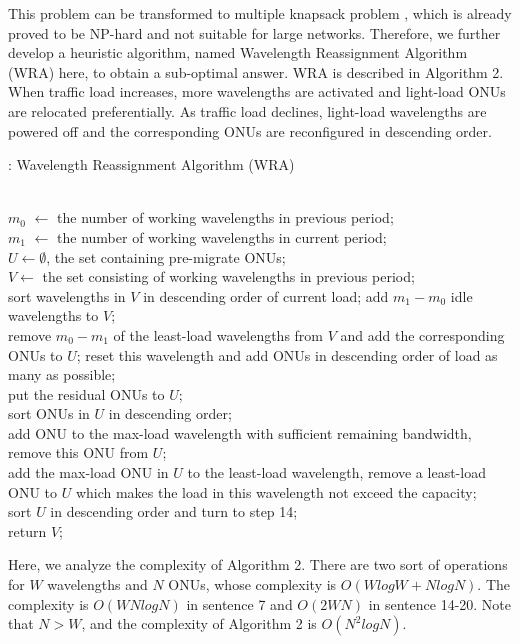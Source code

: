 \documentclass[letter]{IEEEtran}
\begin{document}
This problem can be transformed to multiple knapsack problem \cite{dawande2000approximation}, which is already proved to be NP-hard and not suitable for large networks. Therefore, we further develop a heuristic algorithm, named Wavelength Reassignment Algorithm (WRA) here, to obtain a sub-optimal answer. WRA is described in Algorithm 2. When traffic load increases, more wavelengths are activated and light-load ONUs are relocated preferentially. As traffic load declines, light-load wavelengths are powered off and the corresponding ONUs are reconfigured in descending order.

\begin{algorithm}[h]
    \scriptsize
	\caption{: Wavelength Reassignment Algorithm (WRA)}
	\begin{algorithmic}[1]
		\REQUIRE ~~\\
		$ m_{0} $ $ \leftarrow $ the number of working wavelengths in previous period;\\
		$ m_{1} $ $ \leftarrow $ the number of working wavelengths in current period;\\
	    $ U \leftarrow \emptyset$, the set containing pre-migrate ONUs;\\
	    $ V \leftarrow$ the set consisting of working wavelengths in previous period;\\
        \STATE sort wavelengths in $ V $ in descending order of current load;
	        \STATE add $ m_{1} - m_{0} $ idle wavelengths to $ V $;\\
        \ELSE
	        \STATE remove $ m_{0} - m_{1} $ of the least-load wavelengths from $ V $ and add the corresponding ONUs to $ U $;
	    \ENDIF
		        \STATE reset this wavelength and add ONUs in descending order of load as many as possible;\\
		        \STATE put the residual ONUs to $ U $;\\
		    \ENDIF
		\ENDFOR
		\STATE sort ONUs in $ U $ in descending order;\\
			\STATE add ONU to the max-load wavelength with sufficient remaining bandwidth, remove this ONU from $ U $;\\
		\ENDFOR
			\STATE add the max-load ONU in $ U $ to the least-load wavelength, remove a least-load ONU to $ U $ which makes the load in this wavelength not exceed the capacity;\\
			\STATE sort $U$ in descending order and turn to step 14;\\
		\ENDWHILE
		\STATE return $ V $;\\
	\end{algorithmic}
\end{algorithm}
\vspace{-3.0mm}
Here, we analyze the complexity of Algorithm 2. There are two sort of operations for $W$ wavelengths and $N$ ONUs, whose complexity is $O(WlogW + NlogN)$. The complexity is $O(WNlogN)$ in sentence 7 and $O(2WN)$ in sentence 14-20. Note that $N > W$, and the complexity of Algorithm 2 is $O(N^2logN)$.
\vspace{-4.0mm}
\end{document}

